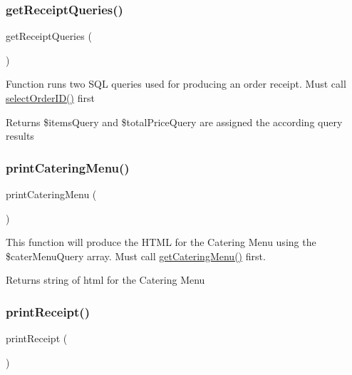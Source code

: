 \subsubsection{\texorpdfstring{getReceiptQueries()}{getReceiptQueries()}}
{\footnotesize\ttfamily get\+Receipt\+Queries (\begin{DoxyParamCaption}{ }\end{DoxyParamCaption})}

Function runs two S\+QL queries used for producing an order receipt. Must call \mbox{\hyperlink{_catering___order___selection_8class_8php_ad8c931daea4616337e35d0add407efa0}{select\+Order\+I\+D()}} first \begin{DoxyReturn}{Returns}
\$items\+Query and \$total\+Price\+Query are assigned the according query results 
\end{DoxyReturn}
\mbox{\label{_catering___order___selection_8class_8php_a5ecee293792f53af2de419b50195e5fd}} 
\subsubsection{\texorpdfstring{printCateringMenu()}{printCateringMenu()}}
{\footnotesize\ttfamily print\+Catering\+Menu (\begin{DoxyParamCaption}{ }\end{DoxyParamCaption})}

This function will produce the H\+T\+ML for the Catering Menu using the \$cater\+Menu\+Query array. Must call \mbox{\hyperlink{_catering___order___selection_8class_8php_a556c7043d3b316ccab6e46f531abec7f}{get\+Catering\+Menu()}} first. \begin{DoxyReturn}{Returns}
string of html for the Catering Menu 
\end{DoxyReturn}
\mbox{\label{_catering___order___selection_8class_8php_a3b05a1e41412a6594da4671a32eb73cd}} 
\subsubsection{\texorpdfstring{printReceipt()}{printReceipt()}}
{\footnotesize\ttfamily print\+Receipt (\begin{DoxyParamCaption}{ }\end{DoxyParamCaption})}

